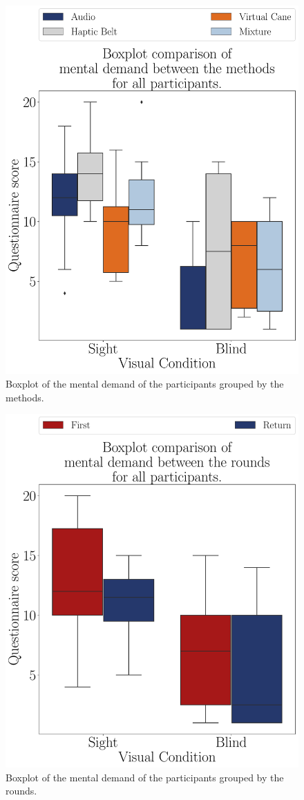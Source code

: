 \begin{figure}[!htb]
    \centering
    \includegraphics[width = 0.75\linewidth]{Resultados/Nasa/Figuras/pdf/boxplot_noBase_md_4_scene.pdf}
    \caption{Boxplot of the mental demand of the participants grouped by the methods.}
    \label{fig:boxplot_noBase_md_4_scene}
\end{figure}
\begin{figure}[!htb]
    \centering
    \includegraphics[width = 0.75\linewidth]{Resultados/Nasa/Figuras/pdf/boxplot_noBase_md_4_rounds.pdf}
    \caption{Boxplot of the mental demand of the participants grouped by the rounds.}
    \label{fig:boxplot_noBase_md_4_rounds}
\end{figure}

